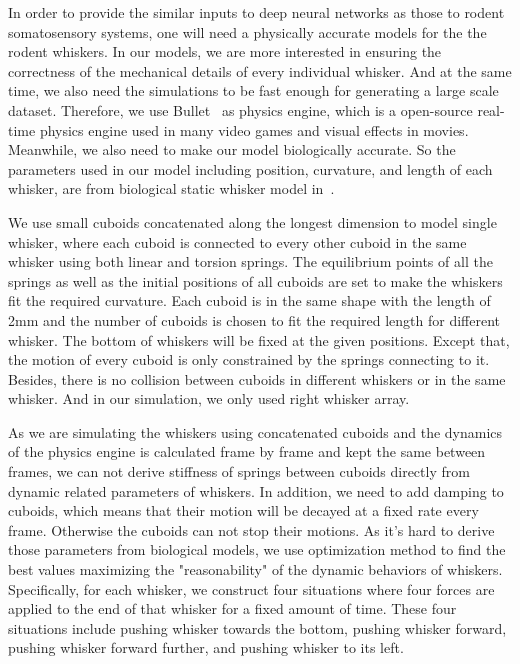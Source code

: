 In order to provide the similar inputs to deep neural networks as those to rodent somatosensory systems, one will need a physically accurate models for the the rodent whiskers.
In our models, we are more interested in ensuring the correctness of the mechanical details of every individual whisker. 
And at the same time, we also need the simulations to be fast enough for generating a large scale dataset. 
Therefore, we use Bullet~\cite{wiki:bullet} as physics engine, which is a open-source real-time physics engine used in many video games and visual effects in movies. 
Meanwhile, we also need to make our model biologically accurate. So the parameters used in our model including position, curvature, and length of each whisker, are from biological static whisker model in~\cite{Towal2011}. 

We use small cuboids concatenated along the longest dimension to model single whisker, where each cuboid is connected to every other cuboid in the same whisker using both linear and torsion springs. 
The equilibrium points of all the springs as well as the initial positions of all cuboids are set to make the whiskers fit the required curvature. 
Each cuboid is in the same shape with the length of 2mm and the number of cuboids is chosen to fit the required length for different whisker. 
The bottom of whiskers will be fixed at the given positions. Except that, the motion of every cuboid is only constrained by the springs connecting to it.
Besides, there is no collision between cuboids in different whiskers or in the same whisker.
And in our simulation, we only used right whisker array.

As we are simulating the whiskers using concatenated cuboids and the dynamics of the physics engine is calculated frame by frame and kept the same between frames, we can not derive stiffness of springs between cuboids directly from dynamic related parameters of whiskers. 
In addition, we need to add damping to cuboids, which means that their motion will be decayed at a fixed rate every frame. Otherwise the cuboids can not stop their motions.
As it's hard to derive those parameters from biological models, we use optimization method to find the best values maximizing the "reasonability" of the dynamic behaviors of whiskers.
Specifically, for each whisker, we construct four situations where four forces are applied to the end of that whisker for a fixed amount of time. 
These four situations include pushing whisker towards the bottom, pushing whisker forward, pushing whisker forward further, and pushing whisker to its left. 

